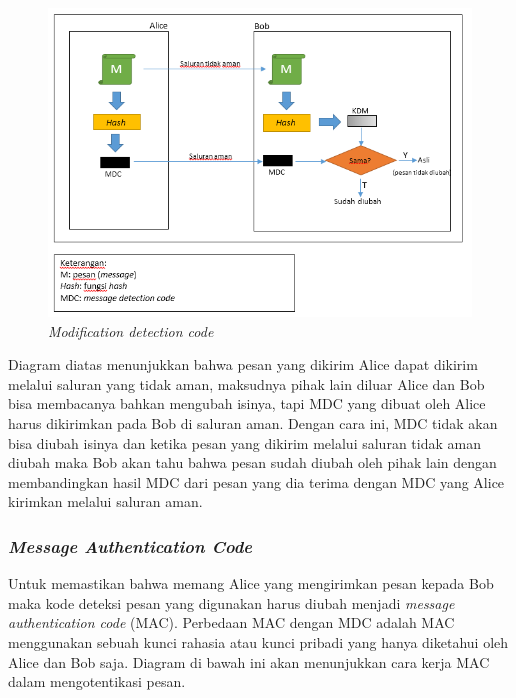 \begin{figure}[ht]
	\includegraphics[scale=0.65]{Gambar/MDC}
	\centering
	\caption{\textit{Modification detection code}}
\end{figure}

Diagram diatas menunjukkan bahwa pesan yang dikirim Alice dapat dikirim melalui saluran yang tidak aman, maksudnya pihak lain diluar Alice dan Bob bisa membacanya bahkan mengubah isinya, tapi MDC yang dibuat oleh Alice harus dikirimkan pada Bob di saluran aman. Dengan cara ini, MDC tidak akan bisa diubah isinya dan ketika pesan yang dikirim melalui saluran tidak aman diubah maka Bob akan tahu bahwa pesan sudah diubah oleh pihak lain dengan membandingkan hasil MDC dari pesan yang dia terima dengan MDC yang Alice kirimkan melalui saluran aman.

\subsubsection{\textit{Message Authentication Code}}
Untuk memastikan bahwa memang Alice yang mengirimkan pesan kepada Bob maka kode deteksi pesan yang digunakan harus diubah menjadi \textit{message authentication code} (MAC). Perbedaan MAC dengan MDC adalah MAC menggunakan sebuah kunci rahasia atau kunci pribadi yang hanya diketahui oleh Alice dan Bob saja. Diagram di bawah ini akan menunjukkan cara kerja MAC dalam mengotentikasi pesan.

